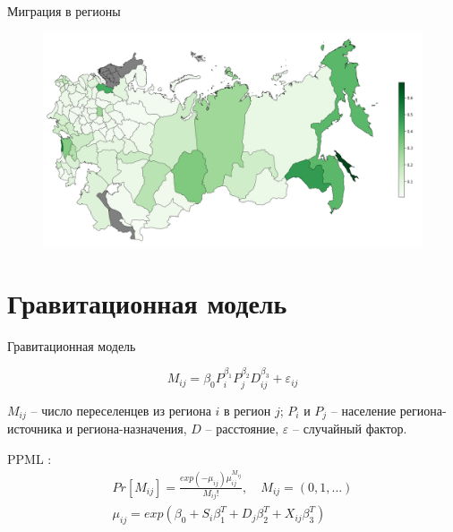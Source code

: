 \documentclass[aspectratio=169]{beamer}
\begin{document}
\begin{frame}{Миграция в регионы}
	
\begin{figure}[h!]
	\includegraphics[height=0.8\textheight]{mig_of_pop_to.png}
\end{figure}
	
\end{frame}

\section{Гравитационная модель}
\begin{frame}{Гравитационная модель}

\begin{equation*}
	M_{ij} = \beta_0 P^{\beta_1}_{i} P^{\beta_2}_{j} D^{\beta_3}_{ij} + \varepsilon_{ij}
\end{equation*}

$M_{ij}$ – число переселенцев из региона $i$ в регион $j$; $P_i$ и $P_j$ -- население региона-источника и региона-назначения, $D$ -- расстояние, $\varepsilon$ -- случайный фактор.

PPML \citep{silva_log_2006}:
\begin{gather*}
	Pr[M_{ij}] = \frac{exp(-\mu_{ij})\mu^{M_{ij}}_{ij}}{M_{ij}!},\quad M_{ij} = (0, 1, ...) \\
	\mu_{ij} = exp(\beta_0 + S_i \beta_1^T + D_{j} \beta_2^T + X_{ij} \beta_3^T)
\end{gather*}

\end{frame}
\end{document}

